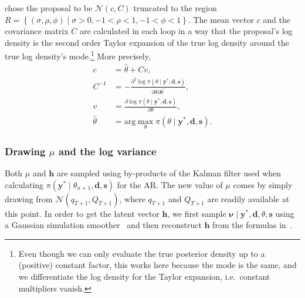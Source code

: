 \citet{Nakajima2009} chose the proposal to be $\mathcal{N}(c, C)$ truncated to the region $R=\left\{(\sigma,\rho,\phi)\mid\sigma>0,-1<\rho<1,-1<\phi<1\right\}$.
The mean vector $c$ and the covariance matrix $C$ are calculated in each loop in a way that the proposal's log density is the second order Taylor expansion of the true log density around the true log density's mode.\footnote{
	Even though we can only evaluate the true posterior density up to a (positive) constant factor, this works here because the mode is the same, and we differentiate the log density for the Taylor expansion, i.e.\ constant multipliers vanish.}
More precisely,
\begin{align*}
c &= \hat{\theta}+Cv, \\
C^{-1} &= -\frac{\partial^2\log\pi(\theta\mid\bm{y}^\ast,\bm{d},\bm s)}{\partial\theta\partial\theta^\prime}, \\
v &= \frac{\partial\log\pi(\theta\mid\bm{y}^\ast,\bm{d},\bm s)}{\partial\theta}, \\
\hat{\theta} &= \text{arg}\max_\theta\pi(\theta\mid\bm{y}^\ast,\bm{d},\bm s).
\end{align*}

\subsubsection{Drawing $\mu$ and the log variance}

Both $\mu$ and $\bm h$ are sampled using by-products of the Kalman filter used when calculating $\pi(\bm{y}^\ast\mid\theta_{n+1},\bm{d},\bm s)$ for the AR.
The new value of $\mu$ comes by simply drawing from $\mathcal{N}(q_{T+1},Q_{T+1})$, where $q_{T+1}$ and $Q_{T+1}$ are readily available at this point.
In order to get the latent vector $\bm h$, we first sample $\bm{\nu}\mid\bm{y}^\ast,\bm{d},\theta,\bm s$ using a Gaussian simulation smoother~\citep{fruhwirth1994data,carter1994gibbs} and then reconstruct $\bm h$ from the formulas in~\citet{de1995simulation}.



